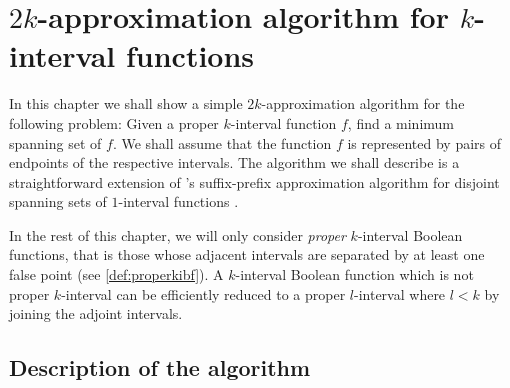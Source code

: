 \chapter{\texorpdfstring{$2k$}{2k}-approximation algorithm
for \texorpdfstring{$k$}{k}-interval functions}
\label{chap:2kapprox}

In this chapter
we shall show a simple $2k$-approximation algorithm for the following problem:
Given a proper $k$-interval function $f$,
find a minimum spanning set of $f$.
We shall assume that the function $f$ is represented by pairs of endpoints of the respective intervals.
The algorithm we shall describe is a straightforward
extension of
\citeauthor{Schieber2005154}'s suffix-prefix
approximation algorithm
for disjoint spanning sets of $1$-interval functions
\citep[section 6]{Schieber2005154}.

In the rest of this chapter,
we will only consider
\emph{proper} $k$-interval Boolean functions,
that is those whose adjacent intervals are separated by
at least one false point
(see \cref{def:properkibf}).
A $k$-interval Boolean function
which is not proper $k$-interval
can be efficiently reduced to a proper $l$-interval
where $l < k$
by joining the adjoint
intervals.

\section{Description of the algorithm}

